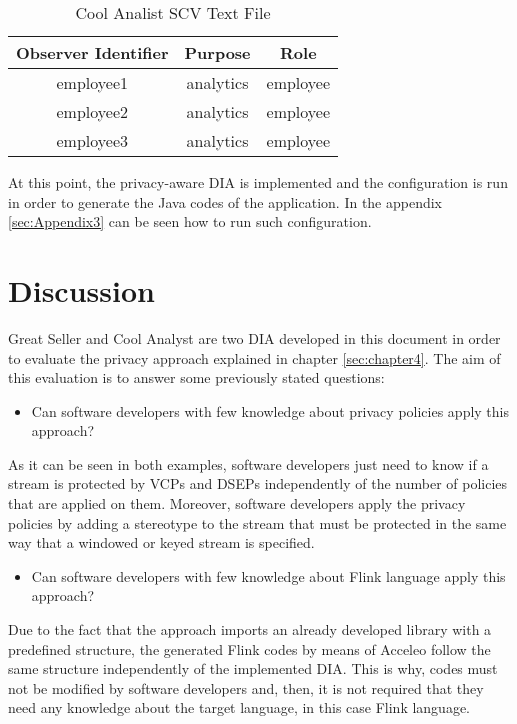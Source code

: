 \begin{table}[h!]
\centering
	\begin{tabular}{||c|c|c||} 
	\hline\hline
	Observer Identifier & Purpose & Role \\ [1ex] 
	\hline\hline
	employee1 & analytics & employee \\
	\hline
	employee2 & analytics & employee \\
	\hline
	employee3 & analytics & employee \\
	\hline\hline
	\end{tabular}
\caption{Cool Analist SCV Text File}
\label{Cool Analist SCV Text File}
\end{table}

At this point, the privacy-aware DIA is implemented and the configuration is run in order to generate the Java codes of the application. In the appendix \ref{sec:Appendix3} can be seen how to run such configuration.

\section{Discussion}

Great Seller and Cool Analyst are two DIA developed in this document in order to evaluate the privacy approach explained in chapter \ref{sec:chapter4}. The aim of this evaluation is to answer some previously stated questions:

\begin{itemize}
\item Can software developers with few knowledge about privacy policies apply this approach?
\end{itemize}

As it can be seen in both examples, software developers just need to know if a stream is protected by VCPs and DSEPs independently of the number of policies that are applied on them. Moreover, software developers apply the privacy policies by adding a stereotype to the stream that must be protected in the same way that a windowed or keyed stream is specified.

\begin{itemize}
\item Can software developers with few knowledge about Flink language apply this approach?
\end{itemize}

Due to the fact that the approach imports an already developed library with a predefined structure, the generated Flink codes by means of Acceleo follow the same structure independently of the implemented DIA. This is why, codes must not be modified by software developers and, then, it is not required that they need any knowledge about the target language, in this case Flink language.

